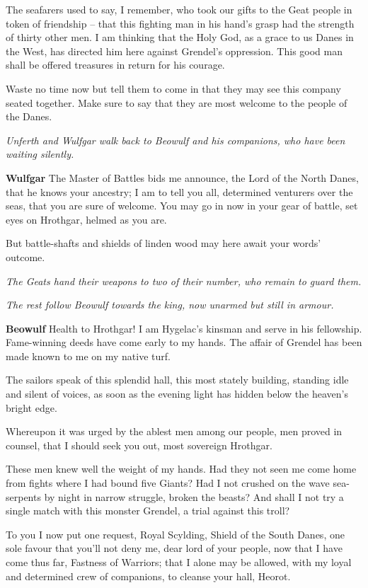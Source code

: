 \documentclass[a4paper]{article}
\begin{document}
{ The seafarers used to say, I remember,
who took our gifts to the Geat people
in token of friendship – that this fighting man
in his hand’s grasp had the strength
of thirty other men. I am thinking that
the Holy God, as a grace to us
Danes in the West, has directed him here
against Grendel’s oppression. This good man shall be
offered treasures in return for his courage.

Waste no time now but tell them to come in
that they may see this company seated together.
Make sure to say that they are most welcome
to the people of the Danes.

\centerline{\textit{Unferth and Wulfgar walk back to Beowulf and his companions, who have been waiting silently.}}

\textbf{Wulfgar} The Master of Battles bids me announce,
the Lord of the North Danes, that he knows your ancestry;
I am to tell you all, determined venturers
over the seas, that you are sure of welcome.
You may go in now in your gear of battle,
set eyes on Hrothgar, helmed as you are.

But battle-shafts and shields of linden wood
may here await your words' outcome.

\centerline{\textit{The Geats hand their weapons to two of their number, who remain to guard them.}}
\centerline{\textit{The rest follow Beowulf towards the king, now unarmed but still in armour.}}

\textbf{Beowulf} Health to Hrothgar! I am Hygelac’s kinsman
and serve in his fellowship. Fame-winning deeds
have come early to my hands. The affair of Grendel
has been made known to me on my native turf.

The sailors speak of this splendid hall,
this most stately building, standing idle
and silent of voices, as soon as the evening light
has hidden below the heaven’s bright edge.

Whereupon it was urged by the ablest men
among our people, men proved in counsel,
that I should seek you out, most sovereign Hrothgar.

These men knew well the weight of my hands.
Had they not seen me come home from fights
where I had bound five Giants?
Had I not crushed on the wave
sea-serpents by night in narrow struggle,
broken the beasts? And shall I not try
a single match with this monster Grendel,
a trial against this troll?

To you I now
put one request, Royal Scylding,
Shield of the South Danes, one sole favour
that you’ll not deny me, dear lord of your people,
now that I have come thus far, Fastness of Warriors;
that I alone may be allowed, with my loyal and determined
crew of companions, to cleanse your hall, Heorot.

}
\end{document}
